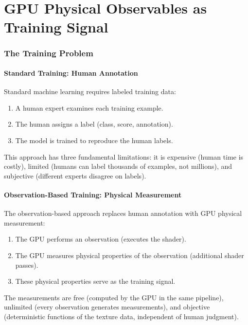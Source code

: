 \documentclass[11pt,twocolumn,a4paper]{article}
\theoremstyle{definition}
\theoremstyle{remark}
\begin{document}

\part{GPU Physical Observables as Training Signal}

\section{The Training Problem}
\label{sec:training_problem}

\subsection{Standard Training: Human Annotation}

Standard machine learning requires labeled training data:
\begin{enumerate}[nosep]
\item A human expert examines each training example.
\item The human assigns a label (class, score, annotation).
\item The model is trained to reproduce the human labels.
\end{enumerate}
This approach has three fundamental limitations: it is expensive (human time is costly), limited (humans can label thousands of examples, not millions), and subjective (different experts disagree on labels).

\subsection{Observation-Based Training: Physical Measurement}

The observation-based approach replaces human annotation with GPU physical measurement:
\begin{enumerate}[nosep]
\item The GPU performs an observation (executes the shader).
\item The GPU measures physical properties of the observation (additional shader passes).
\item These physical properties serve as the training signal.
\end{enumerate}
The measurements are free (computed by the GPU in the same pipeline), unlimited (every observation generates measurements), and objective (deterministic functions of the texture data, independent of human judgment).
\end{document}
